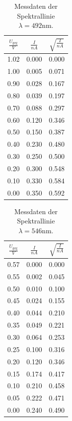 \begin{table}
\centering
	\label{tab:blaugrün}
	\caption{Messdaten der Spektrallinie $\lambda = 492 \text{nm}$.}
	\begin{tabular}{c|c|c}
		\toprule
		{$\frac{U_\text{geg}}{V}$}&{$\frac{I}{nA}$}&{$\sqrt{\frac{I}{nA}}$} \\
		\hline
        \midrule
        1.02 &0.000&0.000\\
	1.00 &0.005&0.071\\
	0.90 &0.028&0.167\\
	0.80 &0.039&0.197\\
	0.70 &0.088&0.297\\
	0.60 &0.120&0.346\\
	0.50 &0.150&0.387\\
	0.40 &0.230&0.480\\
	0.30 &0.250&0.500\\
	0.20 &0.300&0.548\\
	0.10 &0.330&0.584\\
	0.00 &0.350&0.592\\
	\bottomrule 
	\end{tabular}
\end{table}
\begin{table}[H]
\label{tabb:grün}
\centering
	\caption{Messdaten der Spektrallinie $\lambda = 546 \text{nm}$.}
	\begin{tabular}{c|c|c}
		\toprule
		{$\frac{U_\text{geg}}{V}$}&{$\frac{I}{nA}$}&{$\sqrt{\frac{I}{nA}}$} \\
		\hline
        \midrule
        0.57 &0.000&0.000\\
	0.55 &0.002&0.045\\
	0.50 &0.010&0.100\\
	0.45 &0.024&0.155\\
	0.40 &0.044&0.210\\
	0.35 &0.049&0.221\\
	0.30 &0.064&0.253\\
	0.25 &0.100&0.316\\
	0.20 &0.120&0.346\\
	0.15 &0.174&0.417\\
	0.10 &0.210&0.458\\
	0.05 &0.222&0.471\\
	0.00 &0.240&0.490\\
        	\bottomrule 
	\end{tabular}
\end{table}
